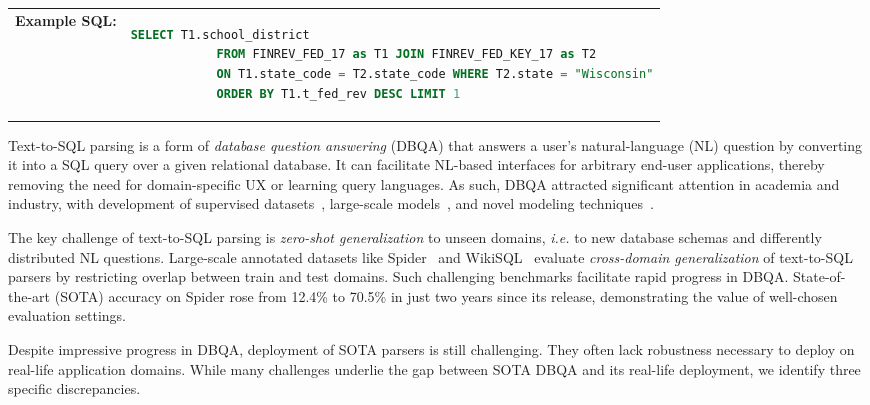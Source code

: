 \documentclass[11pt,a4paper]{article}
\newcommand{\systemname}{\mbox{KaggleDBQA}\xspace}
\newcommand{\eg}{\textit{e.g.}\xspace}
\newcommand{\ie}{\textit{i.e.}\xspace}
\newcommand{\sql}[1]{\lstinline[language=SQL, basicstyle=\footnotesize\ttfamily]{#1}}
\begin{document}
\begin{figure*}[t]
\begin{tabular}{lp{14cm}}
        \hspace{-7pt} \textbf{Example SQL:} &
        \vspace{-2\medskipamount}
        \begin{lstlisting}[language=SQL,gobble=12]
            SELECT T1.school_district
            FROM FINREV_FED_17 as T1 JOIN FINREV_FED_KEY_17 as T2
            ON T1.state_code = T2.state_code WHERE T2.state = "Wisconsin"
            ORDER BY T1.t_fed_rev DESC LIMIT 1
        \end{lstlisting}
        \vspace{-3\medskipamount}
    \end{tabular}
\caption{Two table excerpts from the Student Math Score database in \systemname and an example
        question-SQL pair.
        The column names are abbreviated (\eg \sql{t_fed_rev}) or obscure (\eg \sql{c14}, \sql{c25}) but
        documentation (\eg column descriptions) alleviates this.
        Source: \url{https://kaggle.com/loganhenslee/studentmathscores}.
}
    \label{fig:example}
\end{figure*}

Text-to-SQL parsing is a form of \emph{database question answering} (DBQA) that answers a user's natural-language
(NL) question by converting it into a SQL query over a given relational database.
It can facilitate NL-based interfaces for arbitrary end-user applications, thereby removing the need
for domain-specific UX or learning query languages.
As such, DBQA attracted significant attention in academia and industry, with development of supervised
datasets~\cite{yu-etal-2018-spider}, large-scale models~\cite{wang-etal-2020-rat,zeng-etal-2020-photon}, and novel modeling
techniques~\cite{yu2020grappa,deng2020structure}.

The key challenge of text-to-SQL parsing is \emph{zero-shot generalization} to unseen domains, \ie
to new database schemas and differently distributed NL questions.
Large-scale annotated datasets like Spider~\cite{yu-etal-2018-spider} and WikiSQL~\cite{zhong2017seq2sql}
evaluate \emph{cross-domain generalization} of text-to-SQL parsers by restricting overlap between train and test
domains.
Such challenging benchmarks facilitate rapid progress in DBQA.
State-of-the-art (SOTA) accuracy on Spider rose from 12.4\% to 70.5\% in just two years since its release,
demonstrating the value of well-chosen evaluation settings.

Despite impressive progress in DBQA, deployment of SOTA parsers is still challenging.
They often lack robustness necessary to deploy on real-life application domains.
While many challenges underlie the gap between SOTA DBQA and its real-life deployment, we identify three
specific discrepancies. 
\end{document}
